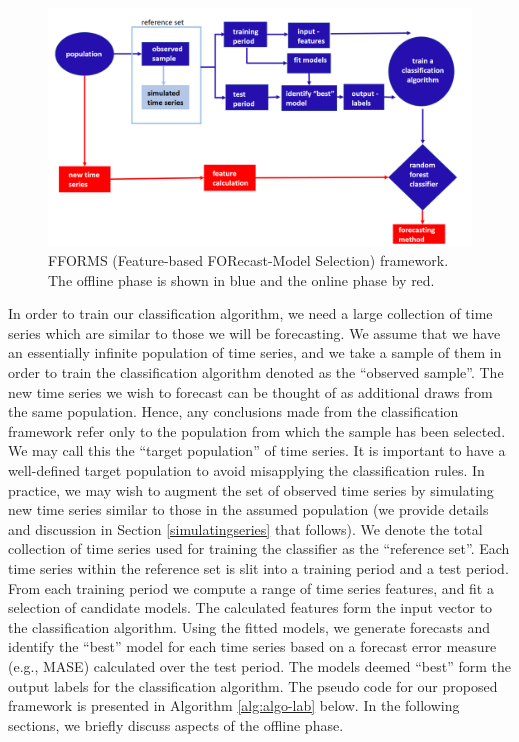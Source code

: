 \documentclass[11pt,a4paper,]{article}
\theoremstyle{definition}
\theoremstyle{definition}
\theoremstyle{definition}
\theoremstyle{remark}
\begin{document}
\begin{figure}

{\centering \includegraphics[width=\textwidth]{figures/framework} 

}

\caption{FFORMS (Feature-based FORecast-Model Selection) framework. The offline phase is shown in blue and the online phase by red.}\label{fig:framework}
\end{figure}

In order to train our classification algorithm, we need a large
collection of time series which are similar to those we will be
forecasting. We assume that we have an essentially infinite population
of time series, and we take a sample of them in order to train the
classification algorithm denoted as the ``observed sample''. The new
time series we wish to forecast can be thought of as additional draws
from the same population. Hence, any conclusions made from the
classification framework refer only to the population from which the
sample has been selected. We may call this the ``target population'' of
time series. It is important to have a well-defined target population to
avoid misapplying the classification rules. In practice, we may wish to
augment the set of observed time series by simulating new time series
similar to those in the assumed population (we provide details and
discussion in Section \ref{simulatingseries} that follows). We denote
the total collection of time series used for training the classifier as
the ``reference set''. Each time series within the reference set is slit
into a training period and a test period. From each training period we
compute a range of time series features, and fit a selection of
candidate models. The calculated features form the input vector to the
classification algorithm. Using the fitted models, we generate forecasts
and identify the ``best'' model for each time series based on a forecast
error measure (e.g., MASE) calculated over the test period. The models
deemed ``best'' form the output labels for the classification algorithm.
The pseudo code for our proposed framework is presented in Algorithm
\ref{alg:algo-lab} below. In the following sections, we briefly discuss
aspects of the offline phase.
\end{document}
